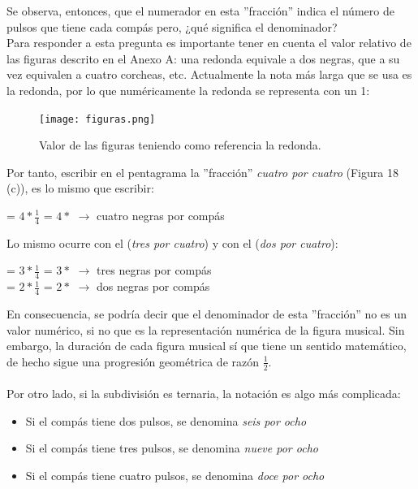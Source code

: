 \documentclass[a4paper, openright, 11pt, titlepage]{report}
\theoremstyle{definition}\newtheorem{defin}[propo]{Definition}
\theoremstyle{definition}\newtheorem{obser}[propo]{Remark}
\theoremstyle{definition}\newtheorem{ejem}[propo]{Ejemplo}
\theoremstyle{definition}\newtheorem{algoritmo}[propo]{Algoritmo}
\begin{document}
Se observa, entonces, que el numerador en esta ''fracción'' indica el número de pulsos que tiene cada compás pero, ¿qué significa el denominador?\\ 
Para responder a esta pregunta es importante tener en cuenta el valor relativo de las figuras descrito en el Anexo A: una redonda equivale a dos negras, que a su vez equivalen a cuatro corcheas, etc. Actualmente la nota más larga que se usa es la redonda, por lo que numéricamente la redonda se representa con un 1:
\begin{figure}[H]
    \centering
    \texttt{[image: figuras.png]}
    \caption{Valor de las figuras teniendo como referencia la redonda.}
\end{figure}
Por tanto, escribir en el pentagrama la ''fracción'' \textit{cuatro por cuatro} (Figura 18 (c)), es lo mismo que escribir:
\begin{center}
     = $4 * \frac{1}{4}$ = $4 * $\musQuarter \hspace{0.3cm} $\longrightarrow$ \hspace{0.3cm} cuatro negras por compás
\end{center}
Lo mismo ocurre con el  (\textit{tres por cuatro}) y con el  (\textit{dos por cuatro}):
\begin{center}
     = $3 * \frac{1}{4}$ = $3 * $\musQuarter \hspace{0.3cm} $\longrightarrow$ \hspace{0.3cm} tres negras por compás\\
     = $2 * \frac{1}{4}$ = $2 * $\musQuarter \hspace{0.3cm} $\longrightarrow$ \hspace{0.3cm} dos negras por compás
\end{center}
En consecuencia, se podría decir que el denominador de esta ''fracción'' no es un valor numérico, si no que es la representación numérica de la figura musical. Sin embargo, la duración de cada figura musical sí que tiene un sentido matemático, de hecho sigue una progresión geométrica de razón $\frac{1}{2}$.\\\\
Por otro lado, si la subdivisión es ternaria, la notación es algo más complicada: 
\begin{itemize}
    \item Si el compás tiene dos pulsos, se denomina \textit{seis por ocho}
    \item Si el compás tiene tres pulsos, se denomina \textit{nueve por ocho}
    \item Si el compás tiene cuatro pulsos, se denomina \textit{doce por ocho}
\end{itemize}
\end{document}
